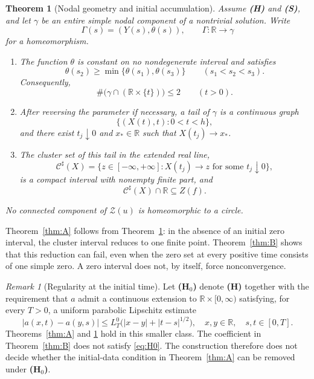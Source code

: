 \documentclass[11pt,reqno]{amsart}
\numberwithin{equation}{section}
\newtheorem{mainthm}{Theorem}
\theoremstyle{definition}
\theoremstyle{remark}
\newtheorem{remark}[theorem]{Remark}
\newcommand{\R}{\mathbb R}
\newcommand{\ZZ}{\mathcal Z}
\begin{document}
\begin{mainthm}[Nodal geometry and initial accumulation]\label{thm:C}
Assume \textbf{(H)} and \textbf{(S)}, and let $\gamma$ be an entire simple nodal component of a nontrivial solution. Write
\[
 \Gamma(s)=(Y(s),\theta(s)),\qquad \Gamma:\R\longrightarrow\gamma
\]
for a homeomorphism.
\begin{enumerate}
\item The function $\theta$ is constant on no nondegenerate interval and satisfies
\begin{equation}\label{eq:novalley}
 \theta(s_2)\geq\min\{\theta(s_1),\theta(s_3)\}
 \qquad(s_1<s_2<s_3).
\end{equation}
Consequently,
\begin{equation}\label{eq:twointersections}
 \#\bigl(\gamma\cap(\R\times\{t\})\bigr)\leq2\qquad(t>0).
\end{equation}
\item After reversing the parameter if necessary, a tail of $\gamma$ is a continuous graph
\begin{equation}\label{eq:tail}
 \{(X(t),t):0<t<h\},
\end{equation}
and there exist $t_j\downarrow0$ and $x_*\in\R$ such that $X(t_j)\to x_*$.
\item The cluster set of this tail in the extended real line,
\begin{equation}\label{eq:clusterdef}
 \mathcal C^\sharp(X)=
 \{z\in[-\infty,+\infty]:
       X(t_j)\to z\text{ for some }t_j\downarrow0\},
\end{equation}
is a compact interval with nonempty finite part, and
\begin{equation}\label{eq:clusterzero}
 \mathcal C^\sharp(X)\cap\R\subseteq Z(f).
\end{equation}
\end{enumerate}
No connected component of $\ZZ(u)$ is homeomorphic to a circle.
\end{mainthm}

Theorem~\ref{thm:A} follows from Theorem~\ref{thm:C}: in the absence of an initial zero interval, the cluster interval reduces to one finite point. Theorem~\ref{thm:B} shows that this reduction can fail, even when the zero set at every positive time consists of one simple zero. A zero interval does not, by itself, force nonconvergence.

\begin{remark}[Regularity at the initial time]\label{rem:H0}
Let \textbf{(H$_0$)} denote \textbf{(H)} together with the requirement
that $a$ admit a continuous extension to $\R\times[0,\infty)$
satisfying, for every $T>0$, a uniform parabolic Lipschitz estimate
\begin{equation}\label{eq:H0}
 |a(x,t)-a(y,s)|\leq L_T^0\bigl(|x-y|+|t-s|^{1/2}\bigr),
 \quad x,y\in\R,\quad s,t\in[0,T].
\end{equation}
Theorems~\ref{thm:A} and \ref{thm:C} hold in this smaller class. The coefficient in Theorem~\ref{thm:B} does not satisfy \eqref{eq:H0}. The construction therefore does not decide whether the initial-data condition in Theorem~\ref{thm:A} can be removed under \textbf{(H$_0$)}.
\end{remark}
\end{document}
